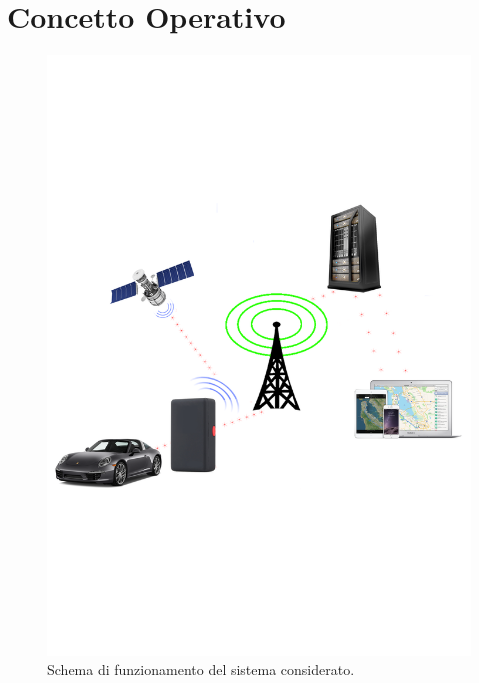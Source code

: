 \documentclass[a4paper,12pt]{article}
\begin{document}
\pagebreak

\section{Concetto Operativo}
\begin{figure}[ht]
\includegraphics[trim={0 6cm 0 6cm}, clip, scale=.75]{Concetto2.png}
\caption{Schema di funzionamento del sistema considerato.}
\end{figure}
\end{document}
